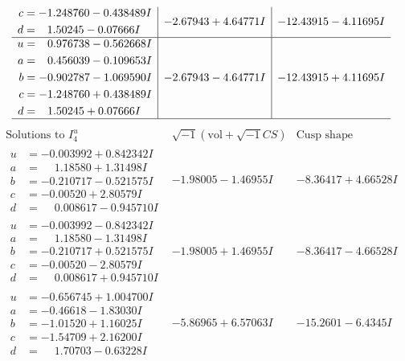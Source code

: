 \documentclass[1p]{elsarticle_modified}
\theoremstyle{definition}
\newcommand{\I}{\sqrt{-1}}
\begin{document}
$$\begin{array}{c|c|c}
\begin{aligned}
c &= -1.248760 - 0.438489 I \\
d &= \phantom{-}1.50245 - 0.07666 I\end{aligned}
 & -2.67943 + 4.64771 I & -12.43915 - 4.11695 I \\ \hline\begin{aligned}
u &= \phantom{-}0.976738 - 0.562668 I \\
a &= \phantom{-}0.456039 - 0.109653 I \\
b &= -0.902787 - 1.069590 I \\
c &= -1.248760 + 0.438489 I \\
d &= \phantom{-}1.50245 + 0.07666 I\end{aligned}
 & -2.67943 - 4.64771 I & -12.43915 + 4.11695 I\\
 \hline 
 \end{array}$$\newpage$$\begin{array}{c|c|c}  
\text{Solutions to }I^u_{4}& \I (\text{vol} + \sqrt{-1}CS) & \text{Cusp shape}\\
 \hline 
\begin{aligned}
u &= -0.003992 + 0.842342 I \\
a &= \phantom{-}1.18580 + 1.31498 I \\
b &= -0.210717 - 0.521575 I \\
c &= -0.00520 + 2.80579 I \\
d &= \phantom{-}0.008617 - 0.945710 I\end{aligned}
 & -1.98005 - 1.46955 I & -8.36417 + 4.66528 I \\ \hline\begin{aligned}
u &= -0.003992 - 0.842342 I \\
a &= \phantom{-}1.18580 - 1.31498 I \\
b &= -0.210717 + 0.521575 I \\
c &= -0.00520 - 2.80579 I \\
d &= \phantom{-}0.008617 + 0.945710 I\end{aligned}
 & -1.98005 + 1.46955 I & -8.36417 - 4.66528 I \\ \hline\begin{aligned}
u &= -0.656745 + 1.004700 I \\
a &= -0.46618 - 1.83030 I \\
b &= -1.01520 + 1.16025 I \\
c &= -1.54709 + 2.16200 I \\
d &= \phantom{-}1.70703 - 0.63228 I\end{aligned}
 & -5.86965 + 6.57063 I & -15.2601 - 6.4345 I \\ \hline\begin{aligned}

\end{aligned}
\end{array}$$
\end{document}
